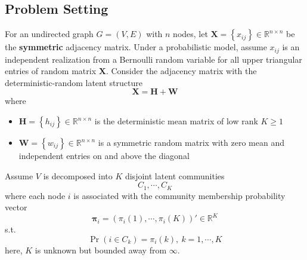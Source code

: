 \documentclass[twoside]{article}
\begin{document}
\subsection{Problem Setting}
For an undirected graph $G=(V,E)$ with $n$ nodes, let $\mathbf{X}=\left\{x_{ij}\right\}\in \mathbb{R}^{n\times n}$ be the \textbf{symmetric} adjacency matrix. Under a probabilistic model, assume $x_{ij}$ is an independent realization from a Bernoulli random variable for all upper triangular entries of random matrix $\mathbf{X}$.
Consider the adjacency matrix with the deterministic-random latent structure $$ \mathbf{X=H+W} $$
where 
\begin{itemize}
    \item $\mathbf{H} = \left\{ h_{ij} \right\} \in \mathbb{R}^{n\times n}$ is the deterministic mean matrix of low rank $K\geq 1$
    \item $\mathbf{W} = \left\{ w_{ij} \right\} \in \mathbb{R}^{n\times n}$ is a symmetric random matrix with zero mean and independent entries on and above the diagonal
\end{itemize}

Assume $V$ is decomposed into $K$ disjoint latent communities $$ C_1, \cdots, C_K $$ where each node $i$ is associated with the community membership probability vector $$\boldsymbol{\pi}_i = \left( \pi_i(1),\cdots,\pi_i(K) \right)' \in \mathbb{R}^K$$
s.t. $$ \Pr(i\in C_k) = \pi_i(k),\ k=1,\cdots,K $$ here, $K$ is unknown but bounded away from $\infty$.
\end{document}
